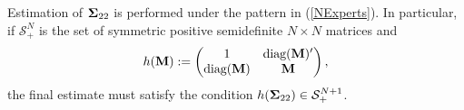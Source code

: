 \documentclass[11pt]{article}
\newcommand{\COR}{\text{COR}}
\theoremstyle{definition}
\theoremstyle{definition}
\def\bSigma{{\bf \Sigma}}
\def\M{{\bf M}}
\def\conv{\text{conv}}
\def\diag{\text{diag}}
\def\diag{\text{diag}}
\begin{document}
Estimation of $\bSigma_{22}$ is performed under the pattern in (\ref{NExperts}). In particular, if $\mathcal{S}_{+}^N$ is the set of  symmetric positive semidefinite $N \times N$ matrices and 
\begin{align*}
h(\M)  := 
\left(\begin{matrix} 
1 & \diag(\M)' \\
\diag(\M) &\M\\
 \end{matrix}\right),
\end{align*}
the final estimate must satisfy the condition $h(\bSigma_{22}) \in \mathcal{S}_{+}^{N+1}$. 
\end{document}
